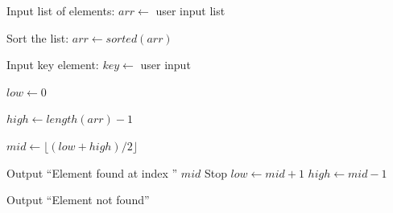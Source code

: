 \begin{algorithm}
\caption{Search an Element Using Binary Search}
\begin{algorithmic}[1]

\STATE Input list of elements:
\STATE $arr \gets$ user input list

\STATE Sort the list:
\STATE $arr \gets sorted(arr)$

\STATE Input key element:
\STATE $key \gets$ user input

\STATE $low \gets 0$

\STATE $high \gets length(arr)-1$


    \STATE $mid \gets \lfloor (low+high)/2 \rfloor$

        \STATE Output ``Element found at index '' $mid$
        \STATE Stop
        \STATE $low \gets mid+1$
    \ELSE
        \STATE $high \gets mid-1$
    \ENDIF

\ENDWHILE

\STATE Output ``Element not found''

\end{algorithmic}
\end{algorithm}